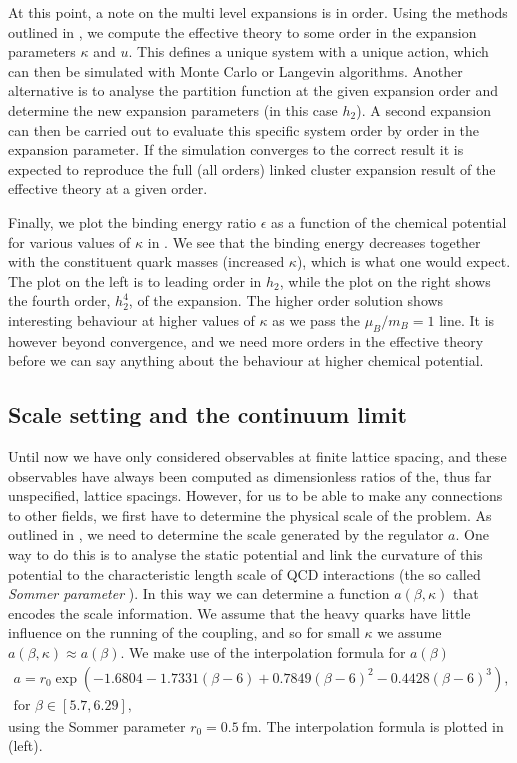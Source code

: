 At this point, a note on the multi level expansions is in order. Using the
methods outlined in , we compute the effective theory to some
order in the expansion parameters $\kappa$ and $u$. This defines a unique system
with a unique action, which can then be simulated with Monte Carlo or Langevin
algorithms. Another alternative is to analyse the partition function at the given
expansion order and determine the new expansion parameters (in this case $h_2$).
A second expansion can then be carried out to evaluate this specific system
order by order in the expansion parameter. If the simulation converges to the
correct result it is expected to reproduce the full (all orders) linked cluster
expansion result of the effective theory at a given order.

Finally, we plot the binding energy ratio $\epsilon$ as a function of the
chemical potential for various values of $\kappa$ in
. We see that the binding energy decreases
together with the constituent quark masses (increased $\kappa$), which is what
one would expect.  The plot on the left is to leading order in $h_2$, while the
plot on the right shows the fourth order, $h_2^4$, of the expansion. The higher
order solution shows interesting behaviour at higher values of $\kappa$ as we
pass the $\mu_B / m_B = 1$ line. It is however beyond convergence, and we need
more orders in the effective theory before we can say anything about the
behaviour at higher chemical potential.

\subsection{Scale setting and the continuum limit}

Until now we have only considered observables at finite lattice spacing, and
these observables have always been computed as dimensionless ratios of the,
thus far unspecified, lattice spacings. However, for us to be able to make any
connections to other fields, we first have to determine the physical scale of
the problem. As outlined in , we need to determine the
scale generated by the regulator $a$. One way to do this is to analyse the
static potential and link the curvature of this potential to the characteristic
length scale of QCD interactions (the so called \emph{Sommer parameter}
\citep{Sommer:1993ce}). In this way we can determine a function
$a(\beta,\kappa)$ that encodes the scale information. We assume that the heavy
quarks have little influence on the running of the coupling, and so for small
$\kappa$ we assume $a(\beta,\kappa) \approx a(\beta)$. We make use of the
interpolation formula for $a(\beta)$ \citep{Necco:2001xg}
%
\begin{multline}
  a = r_0 \exp (-1.6804 - 1.7331(\beta-6) + 0.7849(\beta-6)^2- 0.4428 (\beta-6)^3),\\\text{for } \beta \in [5.7, 6.29],
\end{multline}
%
using the Sommer parameter $r_0 = 0.5 \:\mathrm{fm}$. The interpolation formula
is plotted in  (left).

